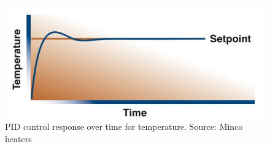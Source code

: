 	\begin{figure}[h!]
    \centering
    \includegraphics[scale=1]{4-experiment-design/img/mechanical/proportionalcontroltemp.JPG}
	\caption{PID control response over time for temperature. Source: Minco heaters}
	\label{fig:PIDcontroltemp}
	\end{figure}

